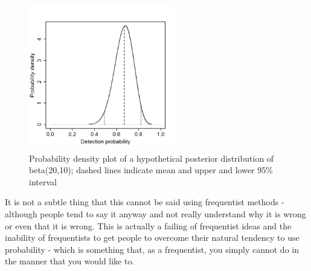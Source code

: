 \begin{figure}
\begin{center}
\includegraphics[height=2.5in]{Ch2-Bayes/figs/densityvsdetection}
\end{center}
\caption{Probability density plot of a hypothetical
 posterior distribution of beta(20,10); dashed lines 
 indicate mean and upper and lower 95\% interval}
\label{densityvsdetection.fig}
\end{figure}

It is not a subtle thing that this
cannot be said using frequentist methods - although people tend to say
it anyway and not really understand why it is wrong or even that it is
wrong. This is actually a failing of frequentist ideas and the
inability of frequentists to get people to overcome their natural
tendency to use probability - which is something that, as a
frequentist, you simply cannot do in the manner that you would like
to.

